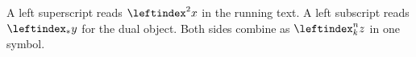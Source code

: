 \documentclass{article}
\begin{document}
A left superscript reads $\leftindex^{2}{x}$ in the running text.
A left subscript reads $\leftindex_{*}{y}$ for the dual object.
Both sides combine as $\leftindex^{n}_{k}{z}$ in one symbol.
\end{document}
